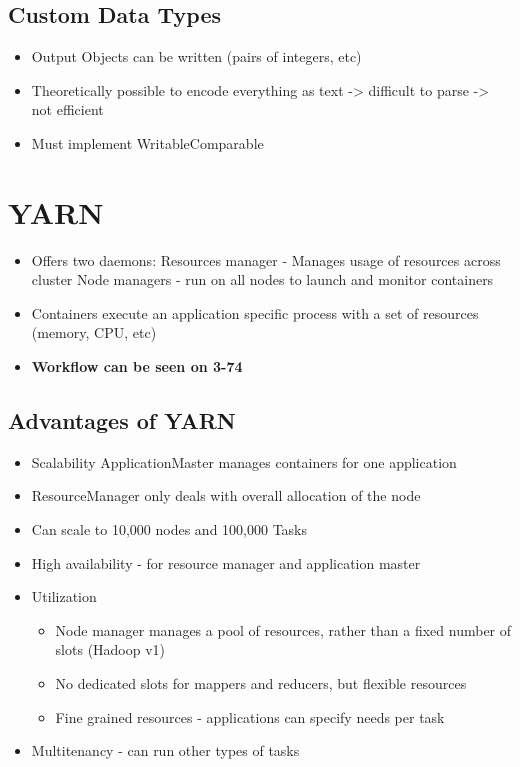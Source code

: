 \documentclass[10pt,a4paper]{scrreprt}
\begin{document}
\subsection{Custom Data Types}
\begin{itemize}
	\item Output Objects can be written (pairs of integers, etc)
	\item Theoretically possible to encode everything as text -> difficult to parse -> not efficient
	\item Must implement WritableComparable
\end{itemize}

\section{YARN}
\begin{itemize}
	\item Offers two daemons:
	\subitem Resources manager - Manages usage of resources across cluster
	\subitem Node managers - run on all nodes to launch and monitor containers
	\item  Containers execute an application specific process with a set of resources (memory, CPU, etc)
	\item \textbf{Workflow can be seen on 3-74}
\end{itemize}
\subsection{Advantages of YARN}
\begin{itemize}
	\item Scalability
	\subitem ApplicationMaster manages containers for one application
	\item ResourceManager only deals with overall allocation of the node
	\item Can scale to 10,000 nodes and 100,000 Tasks
	\item High availability - for resource manager and application master
	\item Utilization
	\begin{itemize}
		\item Node manager manages a pool of resources, rather than a fixed number of slots (Hadoop v1)
		\item No dedicated slots for mappers and reducers, but flexible resources
		\item Fine grained resources - applications can specify needs per task
	\end{itemize}
	\item Multitenancy - can run other types of tasks
\end{itemize}
\end{document}
